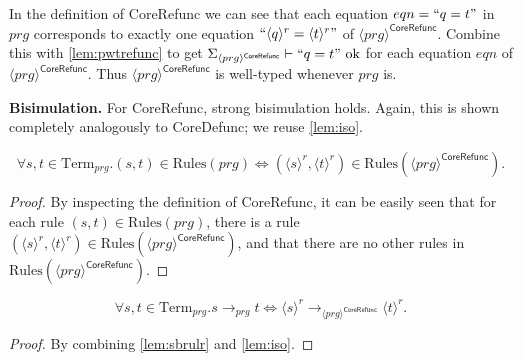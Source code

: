 In the definition of \textsf{CoreRefunc} we can see that each equation $eqn = `` q = t "$ in $prg$ corresponds to exactly one equation $`` \langle q \rangle^r = \langle t \rangle^r "$ of $\langle prg \rangle^{\textsf{CoreRefunc}}$. Combine this with \autoref{lem:pwtrefunc} to get $\Sigma_{\langle prg \rangle^{\textsf{CoreRefunc}}} \vdash `` q = t " \textrm{ ok}$ for each equation $eqn$ of $\langle prg \rangle^{\textsf{CoreRefunc}}$. Thus $\langle prg \rangle^{\textsf{CoreRefunc}}$ is well-typed whenever $prg$ is.

\textbf{Bisimulation.} For \textsf{CoreRefunc}, strong bisimulation holds. Again, this is shown completely analogously to \textsf{CoreDefunc}; we reuse \autoref{lem:iso}.

\begin{lemma}
\label{lem:sbrulr}
\[
\forall s,t \in \textrm{Term}_{prg}. (s, t) \in \textrm{Rules}(prg) \iff (\langle s \rangle^r, \langle t \rangle^r) \in \textrm{Rules}(\langle prg \rangle^{\textsf{CoreRefunc}}).
\]
\begin{proof}
By inspecting the definition of \textsf{CoreRefunc}, it can be easily seen that for each rule $(s, t) \in \textrm{Rules}(prg)$, there is a rule $(\langle s \rangle^r, \langle t \rangle^r) \in \textrm{Rules}(\langle prg \rangle^{\textsf{CoreRefunc}})$, and that there are no other rules in $\textrm{Rules}(\langle prg \rangle^{\textsf{CoreRefunc}})$.
\end{proof}
\end{lemma}

\begin{corollary}
\[
\forall s,t \in \textrm{Term}_{prg}. s \longrightarrow_{prg} t \iff \langle s \rangle^r \longrightarrow_{\langle prg \rangle^{\textsf{CoreRefunc}}} \langle t \rangle^r.
\]
\begin{proof}
By combining \autoref{lem:sbrulr} and \autoref{lem:iso}.
\end{proof}
\end{corollary}
